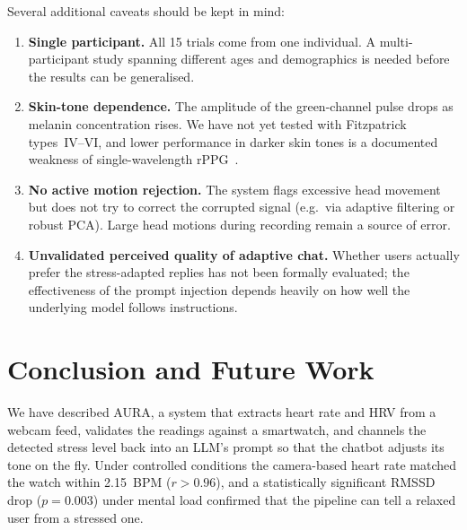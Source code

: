 \documentclass[conference]{IEEEtran}
\begin{document}
Several additional caveats should be kept in mind:

\begin{enumerate}
  \item \textbf{Single participant.} All 15 trials come from one
        individual. A multi-participant study spanning different
        ages and demographics is needed before the results can be
        generalised.

  \item \textbf{Skin-tone dependence.} The amplitude of the green-channel
        pulse drops as melanin concentration rises. We have not yet
        tested with Fitzpatrick types~IV--VI, and lower performance
        in darker skin tones is a documented weakness of
        single-wavelength rPPG~\cite{nowara2020meta}.

  \item \textbf{No active motion rejection.} The system flags excessive
        head movement but does not try to correct the corrupted
        signal (e.g.\ via adaptive filtering or robust PCA).
        Large head motions during recording remain a source of
        error.

  \item \textbf{Unvalidated perceived quality of adaptive chat.}
        Whether users actually prefer the stress-adapted replies
        has not been formally evaluated; the effectiveness of the
        prompt injection depends heavily on how well the underlying
        model follows instructions.
\end{enumerate}


\section{Conclusion and Future Work}
\label{sec:conclusion}

We have described \textsc{AURA}, a system that extracts heart rate
and HRV from a webcam feed, validates the readings against a
smartwatch, and channels the detected stress level back into an
LLM's prompt so that the chatbot adjusts its tone on the fly.
Under controlled conditions the camera-based heart rate matched
the watch within 2.15~BPM ($r > 0.96$), and a statistically
significant RMSSD drop ($p = 0.003$) under mental load confirmed
that the pipeline can tell a relaxed user from a stressed one.
\end{document}
